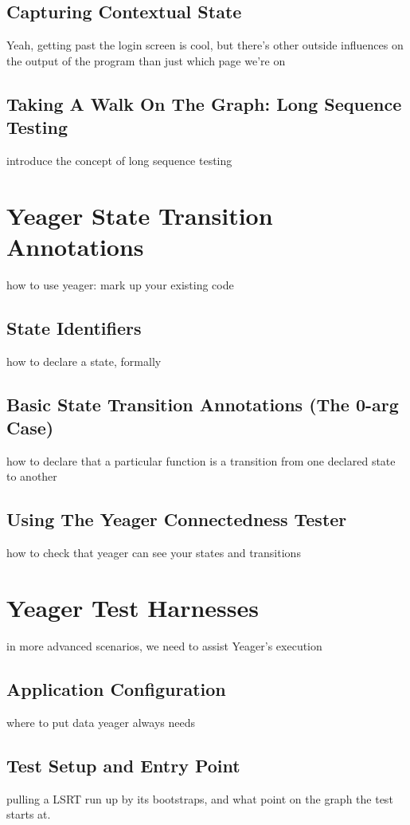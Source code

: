 \subsection{Capturing Contextual State}
Yeah, getting past the login screen is cool, but there's other outside influences on the output of the program than just which page we're on

\subsection{Taking A Walk On The Graph: Long Sequence Testing}
introduce the concept of long sequence testing

\section{Yeager State Transition Annotations}
how to use yeager: mark up your existing code

\subsection{State Identifiers}
how to declare a state, formally

\subsection{Basic State Transition Annotations (The 0-arg Case)}
how to declare that a particular function is a transition from one declared state to another

\subsection{Using The Yeager Connectedness Tester}
how to check that yeager can see your states and transitions

\section{Yeager Test Harnesses}
in more advanced scenarios, we need to assist Yeager's execution

\subsection{Application Configuration}
where to put data yeager always needs

\subsection{Test Setup and Entry Point}
pulling a LSRT run up by its bootstraps, and what point on the graph the test starts at.

